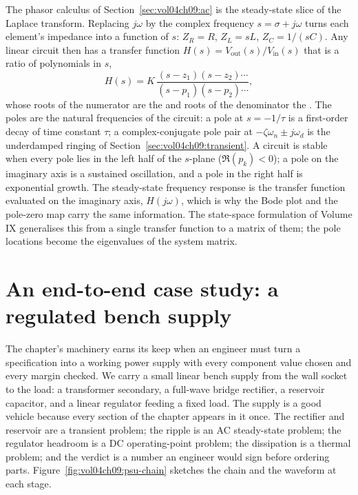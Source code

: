 \begin{mastery}
The phasor calculus of Section~\ref{sec:vol04ch09:ac} is the steady-state
slice of the Laplace transform. Replacing $j\omega$ by the complex
frequency $s = \sigma + j\omega$ turns each element's impedance into a
function of $s$: $Z_{R} = R$, $Z_{L} = sL$, $Z_{C} = 1/(sC)$. Any linear
circuit then has a transfer function $H(s) = V_{\text{out}}(s)/
V_{\text{in}}(s)$ that is a ratio of polynomials in $s$,
\[
H(s) = K\,\frac{(s-z_{1})(s-z_{2})\cdots}{(s-p_{1})(s-p_{2})\cdots},
\]
whose roots of the numerator are the  and roots of the
denominator the . The poles are the natural frequencies
of the circuit: a pole at $s = -1/\tau$ is a first-order decay of time
constant $\tau$; a complex-conjugate pole pair at $-\zeta\omega_{n}\pm
j\omega_{d}$ is the underdamped ringing of
Section~\ref{sec:vol04ch09:transient}. A circuit is stable when every
pole lies in the left half
of the $s$-plane ($\Re(p_{k}) < 0$); a pole on the imaginary axis is a
sustained oscillation, and a pole in the right half is exponential
growth. The steady-state frequency response is the transfer function
evaluated on the imaginary axis, $H(j\omega)$, which is why the Bode
plot and the pole-zero map carry the same information. The state-space
formulation of Volume IX generalises this from a single transfer
function to a matrix of them; the pole locations become the eigenvalues
of the system matrix.
\end{mastery}

\section{An end-to-end case study: a regulated bench supply}
\label{sec:vol04ch09:psu-case}

The chapter's machinery earns its keep when an engineer must turn a
specification into a working power supply with every component value
chosen and every margin checked. We carry a small linear bench supply
from the wall socket to the load: a transformer secondary, a full-wave
bridge rectifier, a reservoir capacitor, and a linear regulator feeding
a fixed load. The supply is a good vehicle because every section of the
chapter appears in it once. The rectifier and reservoir are a transient
problem; the ripple is an AC steady-state problem; the regulator
headroom is a DC operating-point problem; the dissipation is a thermal
problem; and the verdict is a number an engineer would sign before
ordering parts. Figure~\ref{fig:vol04ch09:psu-chain} sketches the chain
and the waveform at each stage.

